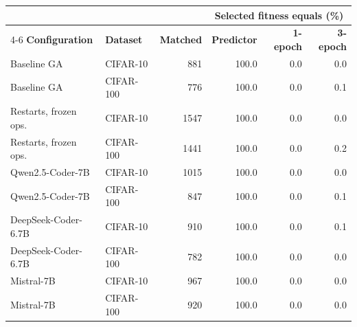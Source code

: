 \begin{tabular}{l l r rrr}
\toprule
 & & & \multicolumn{3}{c}{\textbf{Selected fitness equals (\%)}} \\
\cmidrule(lr){4-6}
\textbf{Configuration} & \textbf{Dataset} & \textbf{Matched} & \textbf{Predictor} & \textbf{1-epoch} & \textbf{3-epoch} \\
\midrule
Baseline GA & CIFAR-10 & 881 & 100.0 & 0.0 & 0.0 \\
Baseline GA & CIFAR-100 & 776 & 100.0 & 0.0 & 0.1 \\
Restarts, frozen ops. & CIFAR-10 & 1547 & 100.0 & 0.0 & 0.0 \\
Restarts, frozen ops. & CIFAR-100 & 1441 & 100.0 & 0.0 & 0.2 \\
Qwen2.5-Coder-7B & CIFAR-10 & 1015 & 100.0 & 0.0 & 0.0 \\
Qwen2.5-Coder-7B & CIFAR-100 & 847 & 100.0 & 0.0 & 0.1 \\
DeepSeek-Coder-6.7B & CIFAR-10 & 910 & 100.0 & 0.0 & 0.1 \\
DeepSeek-Coder-6.7B & CIFAR-100 & 782 & 100.0 & 0.0 & 0.0 \\
Mistral-7B & CIFAR-10 & 967 & 100.0 & 0.0 & 0.0 \\
Mistral-7B & CIFAR-100 & 920 & 100.0 & 0.0 & 0.0 \\
\bottomrule
\end{tabular}
